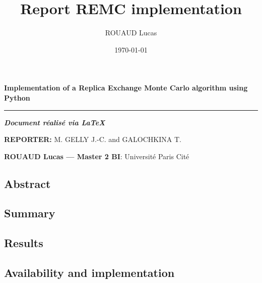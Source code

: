 \documentclass[12pt, twoside, a4paper]{report}
\title{Report REMC implementation}
\author{ROUAUD Lucas}
\date{\today}
\begin{document}
\begin{huge}
    \begin{flushleft}
        \bfseries Implementation of a Replica Exchange\linebreak
        Monte Carlo algorithm using Python
    
        \vspace{1ex}
        
        \hrule height 2pt
    \end{flushleft}
\end{huge}

\vspace{1ex}

\textit{\textbf{\large Document réalisé via \LaTeX{}}}

\textbf{REPORTER:} M. GELLY J.-C. and GALOCHKINA T.

\textbf{ROUAUD Lucas --- Master 2 BI}: Université Paris Cité

\begin{center}
    \begin{minipage}{15cm}
        \section*{Abstract}
        \subsection*{Summary}

        \subsection*{Results}

        \subsection*{Availability and implementation}
    \end{minipage}
\end{center}
\end{document}

